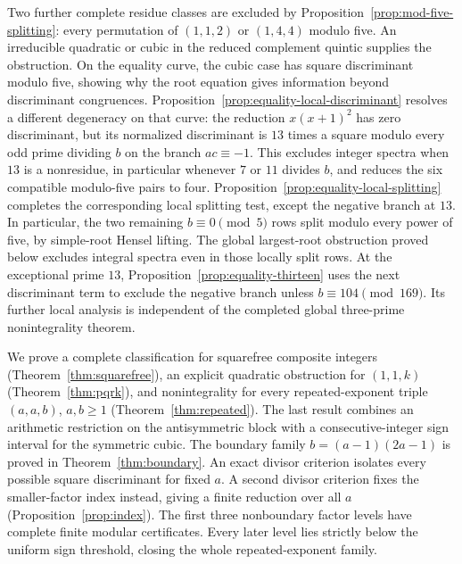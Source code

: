 Two further complete residue classes are excluded by
Proposition~\ref{prop:mod-five-splitting}: every permutation of $(1,1,2)$
or $(1,4,4)$ modulo five. An irreducible quadratic or cubic in the
reduced complement quintic supplies the obstruction. On the equality
curve, the cubic case has square discriminant modulo five, showing
why the root equation gives information beyond discriminant congruences.
Proposition~\ref{prop:equality-local-discriminant} resolves a different
degeneracy on that curve: the reduction $x(x+1)^2$ has zero discriminant,
but its normalized discriminant is $13$ times a square modulo every odd
prime dividing $b$ on the branch $ac\equiv-1$. This excludes integer
spectra when $13$ is a nonresidue, in particular whenever $7$ or $11$
divides $b$, and reduces the six compatible modulo-five pairs to four.
Proposition~\ref{prop:equality-local-splitting} completes the corresponding
local splitting test, except the negative branch at $13$. In particular,
the two remaining $b\equiv0\pmod5$ rows split modulo every power of
five, by simple-root Hensel lifting. The global largest-root obstruction
proved below excludes integral spectra even in those locally split rows.
At the exceptional prime $13$, Proposition~\ref{prop:equality-thirteen}
uses the next discriminant term to exclude the negative branch unless
$b\equiv104\pmod{169}$. Its further local analysis is independent of the completed global
three-prime nonintegrality theorem.

We prove a complete classification for squarefree composite integers
(Theorem~\ref{thm:squarefree}), an explicit quadratic obstruction for
$(1,1,k)$ (Theorem~\ref{thm:pqrk}), and nonintegrality for every
repeated-exponent triple $(a,a,b)$, $a,b\geq1$
(Theorem~\ref{thm:repeated}). The last result combines an arithmetic
restriction on the antisymmetric block with a consecutive-integer sign
interval for the symmetric cubic. The boundary family
$b=(a-1)(2a-1)$ is proved in Theorem~\ref{thm:boundary}.
An exact divisor criterion isolates every possible square discriminant for
fixed $a$. A second divisor criterion fixes the smaller-factor index instead,
giving a finite reduction over all $a$ (Proposition~\ref{prop:index}).
The first three nonboundary factor levels have complete finite modular
certificates. Every later level lies strictly below the uniform sign
threshold, closing the whole repeated-exponent family.

